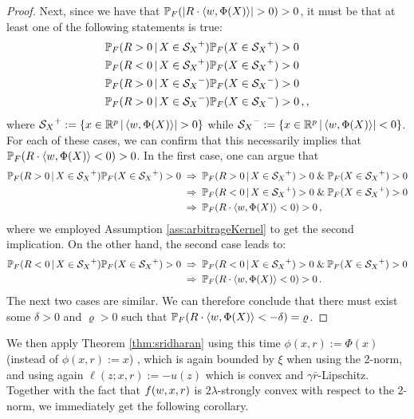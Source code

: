 \documentclass[]{interact}
\theoremstyle{plain}%
\theoremstyle{definition}
\theoremstyle{remark}
\def\Prob{{\mathbb P}}
\newcommand{\0}{\V{0}}
\newcommand{\1}{\V{1}}
\renewcommand{\Re}{\mathbb{R}}
\theoremstyle{plain}
\theoremstyle{definition}
\begin{document}
\begin{proof}
Next, since we have that $\Prob_F(|R\cdot\langle \kq, \Phi(X)\rangle| > 0) >0$, it must be that at least one of the following statements is true:
\begin{align*}
&\Prob_F(R>0 \,|\, X \in \Sx^+) \Prob_F(X \in \Sx^+) >0\\
&\Prob_F(R<0 \,|\, X \in \Sx^+) \Prob_F(X \in \Sx^+) >0\\
&\Prob_F(R>0 \,|\, X \in \Sx^-) \Prob_F(X \in \Sx^-) >0\\
&\Prob_F(R>0 \,|\, X \in \Sx^-) \Prob_F(X \in \Sx^-) >0\,,,
\end{align*}
where $\Sx^+:=\{ x\in\Re^p\,|\, \langle \kq, \Phi(X)\rangle| > 0 \}$ while $\Sx^-:=\{ x\in\Re^p\,|\, \langle \kq, \Phi(X)\rangle| < 0 \}$. For each of these cases, we can confirm that this necessarily implies that $\Prob_F(R\cdot \langle \kq, \Phi(X)\rangle <0)>0$. In the first case, one can argue that
\begin{align*}
\Prob_F(R>0 \,|\, X \in \Sx^+) \Prob_F(X \in \Sx^+) >0 &\;\Rightarrow\; \Prob_F(R>0 \,|\, X \in \Sx^+)>0 \;\&\; \Prob_F(X \in \Sx^+) >0 \\
&\;\Rightarrow\; \Prob_F(R<0 \,|\, X \in \Sx^+)>0 \;\&\; \Prob_F(X \in \Sx^+) >0 \\
&\;\Rightarrow\; \Prob_F(R\cdot \langle \kq, \Phi(X)\rangle <0)>0\,,
\end{align*}
where we employed Assumption \ref{ass:arbitrageKernel} to get the second implication. On the other hand, the second case leads to:
\begin{align*}
\Prob_F(R<0 \,|\, X \in \Sx^+) \Prob_F(X \in \Sx^+) >0 &\;\Rightarrow\; \Prob_F(R<0 \,|\, X \in \Sx^+)>0 \;\&\; \Prob_F(X \in \Sx^+) >0 \\
&\;\Rightarrow\; \Prob_F(R\cdot \langle \kq, \Phi(X)\rangle <0)>0\,.
\end{align*}
The next two cases are similar. We can therefore conclude that there must exist some $\delta>0$ and $\varrho>0$ such that $\Prob_F(R\cdot \langle \kq, \Phi(X)\rangle < -\delta ) = \varrho$.
\end{proof}

We then apply Theorem \ref{thm:sridharan} using this time $\phi(x,r):=\Phi(x)$ (instead of $\phi(x,r):=x$) , which is again bounded by $\xi$ when using the 2-norm, and using again $\ell(z;x,r):=-u(z)$ which is convex and $\gamma\bar{r}$-Lipschitz. Together with the fact that $f({w},x,r)$ is $2\lambda$-strongly convex with respect to the 2-norm, we immediately get the following corollary. 
 
\end{document}
